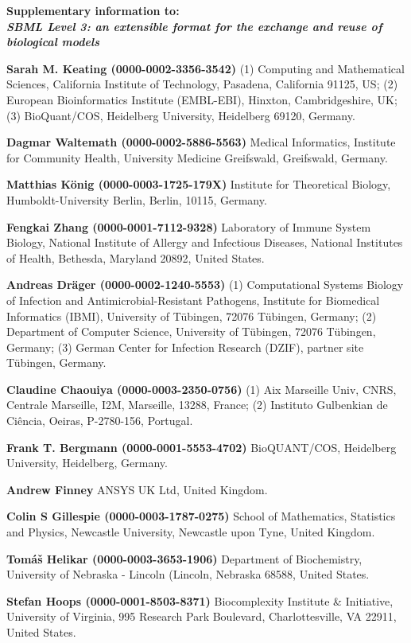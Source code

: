 \documentclass{sbml-paper}
\begin{document}
\begin{center}\large\bfseries
Supplementary information to:\\
\emph{SBML Level 3: an extensible format for the exchange and reuse of biological models}
\end{center}

\textbf{Sarah M. Keating (0000-0002-3356-3542)} (1) Computing and Mathematical Sciences, California Institute of Technology, Pasadena, California 91125, US; (2) European Bioinformatics Institute (EMBL-EBI), Hinxton, Cambridgeshire, UK; (3) BioQuant/COS, Heidelberg University, Heidelberg 69120, Germany.

\textbf{Dagmar Waltemath (0000-0002-5886-5563)} Medical Informatics, Institute for Community Health, University Medicine Greifswald, Greifswald, Germany.

\textbf{Matthias K\"{o}nig (0000-0003-1725-179X)} Institute for Theoretical Biology, Humboldt-University Berlin, Berlin, 10115, Germany.

\textbf{Fengkai Zhang (0000-0001-7112-9328)} Laboratory of Immune System Biology, National Institute of Allergy and Infectious Diseases, National Institutes of Health, Bethesda, Maryland 20892, United States.

\textbf{Andreas Dräger (0000-0002-1240-5553)} (1) Computational Systems Biology of Infection and Antimicrobial-Resistant Pathogens, Institute for Biomedical Informatics (IBMI), University of Tübingen, 72076 Tübingen, Germany; (2) Department of Computer Science, University of Tübingen, 72076 Tübingen, Germany; (3) German Center for Infection Research (DZIF), partner site Tübingen, Germany.

\textbf{Claudine Chaouiya (0000-0003-2350-0756)} (1) Aix Marseille Univ, CNRS, Centrale Marseille, I2M, Marseille, 13288, France; (2) Instituto Gulbenkian de Ciência, Oeiras, P-2780-156, Portugal.

\textbf{Frank T. Bergmann (0000-0001-5553-4702)} BioQUANT/COS, Heidelberg University, Heidelberg, Germany.

\textbf{Andrew Finney} ANSYS UK Ltd, United Kingdom.
	
\textbf{Colin S Gillespie (0000-0003-1787-0275)} School of Mathematics, Statistics and Physics, Newcastle University, Newcastle upon Tyne, United Kingdom.

\textbf{Tomáš Helikar (0000-0003-3653-1906)} Department of Biochemistry, University of Nebraska - Lincoln (Lincoln, Nebraska 68588, United States.

\textbf{Stefan Hoops (0000-0001-8503-8371)} Biocomplexity Institute & Initiative, University of Virginia, 995 Research Park Boulevard, Charlottesville, VA 22911, United States.
\end{document}
